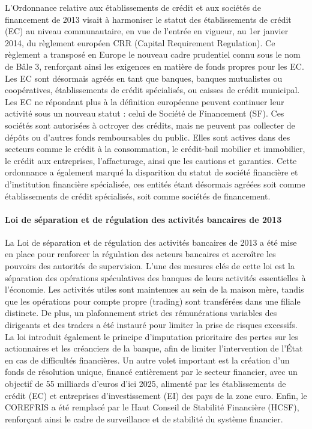\documentclass[a4paper, 12pt]{report}
\begin{document}
L'Ordonnance relative aux établissements de crédit et aux sociétés de financement de 2013 visait à harmoniser le statut des établissements de crédit (EC) au niveau communautaire, en vue de l’entrée en vigueur, au 1er janvier 2014, du règlement européen CRR (Capital Requirement Regulation). Ce règlement a transposé en Europe le nouveau cadre prudentiel connu sous le nom de Bâle 3, renforçant ainsi les exigences en matière de fonds propres pour les EC. Les EC sont désormais agréés en tant que banques, banques mutualistes ou coopératives, établissements de crédit spécialisés, ou caisses de crédit municipal. Les EC ne répondant plus à la définition européenne peuvent continuer leur activité sous un nouveau statut : celui de Société de Financement (SF). Ces sociétés sont autorisées à octroyer des crédits, mais ne peuvent pas collecter de dépôts ou d’autres fonds remboursables du public. Elles sont actives dans des secteurs comme le crédit à la consommation, le crédit-bail mobilier et immobilier, le crédit aux entreprises, l'affacturage, ainsi que les cautions et garanties. Cette ordonnance a également marqué la disparition du statut de société financière et d'institution financière spécialisée, ces entités étant désormais agréées soit comme établissements de crédit spécialisés, soit comme sociétés de financement.

\paragraph{Loi de séparation et de régulation des activités bancaires de 2013}

La Loi de séparation et de régulation des activités bancaires de 2013 a été mise en place pour renforcer la régulation des acteurs bancaires et accroître les pouvoirs des autorités de supervision. L'une des mesures clés de cette loi est la séparation des opérations spéculatives des banques de leurs activités essentielles à l’économie. Les activités utiles sont maintenues au sein de la maison mère, tandis que les opérations pour compte propre (trading) sont transférées dans une filiale distincte. De plus, un plafonnement strict des rémunérations variables des dirigeants et des traders a été instauré pour limiter la prise de risques excessifs. La loi introduit également le principe d’imputation prioritaire des pertes sur les actionnaires et les créanciers de la banque, afin de limiter l’intervention de l’État en cas de difficultés financières. Un autre volet important est la création d’un fonds de résolution unique, financé entièrement par le secteur financier, avec un objectif de 55 milliards d’euros d’ici 2025, alimenté par les établissements de crédit (EC) et entreprises d’investissement (EI) des pays de la zone euro. Enfin, le COREFRIS a été remplacé par le Haut Conseil de Stabilité Financière (HCSF), renforçant ainsi le cadre de surveillance et de stabilité du système financier.
\end{document}
